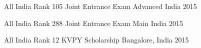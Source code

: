 \begin{cvhonors}

  \cvhonor
  {All India Rank 105}
  {Joint Entrance Exam Advanced}
  {India}
  {2015}

  \cvhonor
  {All India Rank 288}
  {Joint Entrance Exam Main}
  {India}
  {2015}

  \cvhonor
  {All India Rank 12}
  {KVPY Scholarship}
  {Bangalore, India}
  {2015}

\end{cvhonors}

